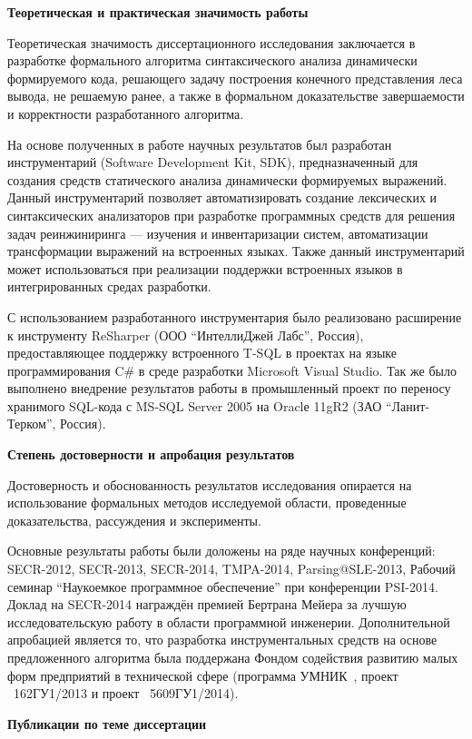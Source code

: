 \textbf{Теоретическая и практическая значимость работы}

Теоретическая значимость диссертационного исследования заключается в разработке формального алгоритма синтаксического анализа динамически формируемого кода, решающего задачу построения конечного представления леса вывода, не решаемую ранее, а также в формальном доказательстве завершаемости и корректности разработанного алгоритма. 

На основе полученных в работе научных результатов был разработан инструментарий (Software Development Kit, SDK), предназначенный для создания средств статического анализа динамически формируемых выражений. Данный инструментарий позволяет автоматизировать создание лексических и синтаксических анализаторов при разработке программных средств для решения задач реинжиниринга --- изучения и инвентаризации систем, автоматизации трансформации выражений на встроенных языках. Также данный инструментарий может использоваться при реализации поддержки встроенных языков в интегрированных средах разработки.

С использованием разработанного инструментария было реализовано расширение к инструменту ReSharper (ООО ``ИнтеллиДжей Лабс'', Россия), предоставляющее поддержку встроенного T-SQL в проектах на языке программирования C\# в среде разработки Microsoft Visual Studio. Так же было выполнено внедрение результатов работы в промышленный проект по переносу хранимого SQL-кода с MS-SQL Server 2005 на Oraclе 11gR2 (ЗАО ``Ланит-Терком'', Россия). 

\textbf{Степень достоверности и апробация результатов}

Достоверность и обоснованность результатов исследования опирается на использование формальных методов исследуемой области, проведенные доказательства, рассуждения и эксперименты.

Основные результаты работы были доложены на ряде научных конференций: SECR-2012, SECR-2013, SECR-2014, TMPA-2014, Parsing@SLE-2013, Рабочий семинар ``Наукоемкое программное обеспечение'' при конференции PSI-2014. Доклад на SECR-2014 награждён премией Бертрана Мейера за лучшую исследовательскую работу в области программной инженерии. Дополнительной апробацией является то, что разработка инструментальных средств на основе предложенного алгоритма была поддержана Фондом содействия развитию малых форм предприятий в технической сфере (программа УМНИК~\cite{UMNIC}, проект \textnumero~162ГУ1/2013 и проект \textnumero~5609ГУ1/2014).

\textbf{Публикации по теме диссертации}

